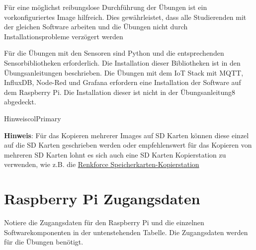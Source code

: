 \documentclass[
  11pt,
  a4paperpaper,
  oneside, openany  ,captions=tableheading
]{scrbook}
\theoremstyle{definition}
\theoremstyle{remark}
\begin{document}
Für eine möglichst reibungslose Durchführung der Übungen ist ein
vorkonfiguriertes Image hilfreich. Dies gewährleistet, dass alle
Studierenden mit der gleichen Software arbeiten und die Übungen nicht
durch Installationsprobleme verzögert werden

Für die Übungen mit den Sensoren sind Python und die entsprechenden
Sensorbibliotheken erforderlich. Die Installation dieser Bibliotheken
ist in den Übungsanleitungen beschrieben. Die Übungen mit dem IoT Stack
mit MQTT, InfluxDB, Node-Red und Grafana erfordern eine Installation der
Software auf dem Raspberry Pi. Die Installation dieser ist nicht in der
Übungsanleitung8 abgedeckt.

\begin{boxtitle}{Hinweis}{colPrimary}

\textbf{Hinweis}: Für das Kopieren mehrerer Images auf SD Karten können
diese einzel auf die SD Karten geschrieben werden oder empfehlenswert
für das Kopieren von mehreren SD Karten lohnt es sich auch eine SD
Karten Kopierstation zu verwenden, wie z.B. die
\href{https://www.digitec.ch/de/s1/product/renkforce-tragbares-sdmicrosd-flash-lesegeraet-mit-kopierfunktion-v-1-auf-2-von-speicherkartenlesege-14550270}{Renkforce
Speicherkarten-Kopierstation}

\end{boxtitle}

\section{Raspberry Pi Zugangsdaten}\label{raspberry-pi-zugangsdaten}

Notiere die Zugangsdaten für den Raspberry Pi und die einzelnen
Softwarekomponenten in der untenstehenden Tabelle. Die Zugangsdaten
werden für die Übungen benötigt.
\end{document}
